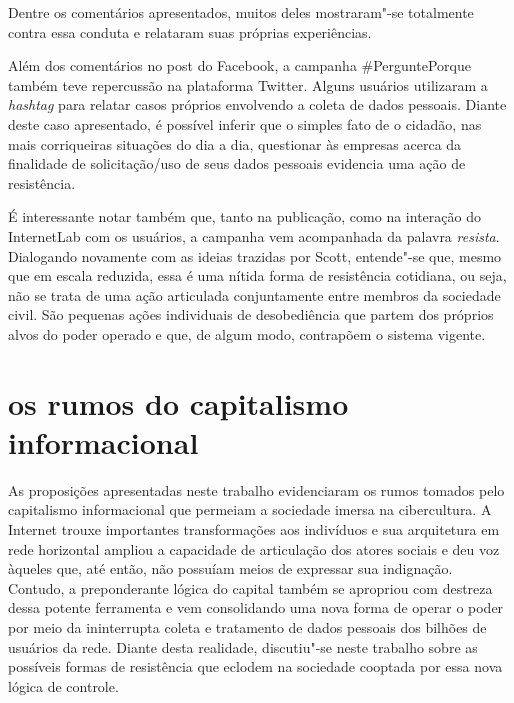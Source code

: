 Dentre os comentários apresentados, muitos deles mostraram"-se totalmente
contra essa conduta e relataram suas próprias experiências. 




Além dos comentários no post do Facebook, a campanha \#PerguntePorque
também teve repercussão na plataforma Twitter. Alguns usuários
utilizaram a \textit{hashtag} para relatar casos próprios envolvendo a
coleta de dados pessoais. Diante deste caso apresentado, é possível
inferir que o simples fato de o cidadão, nas mais corriqueiras situações
do dia a dia, questionar às empresas acerca da finalidade de
solicitação/uso de seus dados pessoais evidencia uma ação de
resistência.

É interessante notar também que, tanto na publicação, como na interação
do InternetLab com os usuários, a campanha vem acompanhada da palavra
\textit{resista}. Dialogando novamente com as ideias trazidas por Scott,
entende"-se que, mesmo que em escala reduzida, essa é uma nítida forma de
resistência cotidiana, ou seja, não se trata de uma ação articulada
conjuntamente entre membros da sociedade civil. São pequenas ações
individuais de desobediência que partem dos próprios alvos do poder
operado e que, de algum modo, contrapõem o sistema vigente.

\section{os rumos do capitalismo informacional}

As proposições apresentadas neste trabalho evidenciaram os rumos tomados
pelo capitalismo informacional que permeiam a sociedade imersa na
cibercultura. A Internet trouxe importantes transformações aos
indivíduos e sua arquitetura em rede horizontal ampliou a capacidade de
articulação dos atores sociais e deu voz àqueles que, até então, não
possuíam meios de expressar sua indignação. Contudo, a preponderante
lógica do capital também se apropriou com destreza dessa potente
ferramenta e vem consolidando uma nova forma de operar o poder por meio
da ininterrupta coleta e tratamento de dados pessoais dos bilhões de
usuários da rede. Diante desta realidade, discutiu"-se neste trabalho
sobre as possíveis formas de resistência que eclodem na sociedade
cooptada por essa nova lógica de controle.

